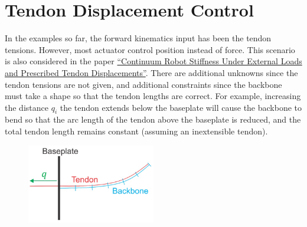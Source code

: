 \documentclass[12pt]{article}
\begin{document}
\section{Tendon Displacement Control}

In the examples so far, the forward kinematics input has been the tendon tensions. However, most actuator control position instead of force. This scenario is also considered in the paper \href{https://ieeexplore.ieee.org/document/8606257}{``Continuum Robot Stiffness Under External Loads and Prescribed Tendon Displacements''}. There are additional unknowns since the tendon tensions are not given, and additional constraints since the backbone must take a shape so that the tendon lengths are correct. For example, increasing the distance $q_i$ the tendon extends below the baseplate will cause the backbone to bend so that the arc length of the tendon above the baseplate is reduced, and the total tendon length remains constant (assuming an inextensible tendon).

\begin{figure}[h]
	\centering
		\includegraphics[width=0.5\textwidth]{fig/DisplacementControl.jpg}
\end{figure}
\end{document}
